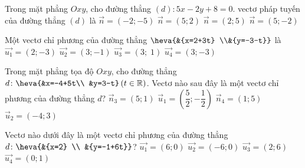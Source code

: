\begin{ex}%
	Trong mặt phẳng $Oxy$, cho đường thẳng $(d)\colon 5x-2y+8=0$. vectơ pháp tuyến của  đường thẳng $(d)$ là
	 \choice
		{$\overrightarrow{n}=(-2;-5)$} 
		 {$\overrightarrow{n}=(5; 2)$}
		{$\overrightarrow{n}=(2; 5)$} 
		{\True $\overrightarrow{n}=(5;-2)$} 
\end{ex}

\begin{ex}%
	 Một vectơ chỉ phương của đường thẳng $\heva{&{x=2+3t} \\&{y=-3-t}}$ là
	\choice 
		{$\overrightarrow{u_1}=\left(2;-3\right)$} 
		{\True $\overrightarrow{u_2}=\left(3;-1\right)$} 
		{$\overrightarrow{u_3}=\left(3;  \; 1\right)$}
		{$\overrightarrow{u_4}=\left(3;-3\right)$} 
\end{ex}

\begin{ex}%
	Trong mặt phẳng  tọa độ $Oxy $, cho đường thẳng $d\colon \heva{&x=-4+5t\\ &y=3-t}\left( t\in\mathbb{R}\right) $. Vectơ nào sau đây là một vectơ chỉ phương của đường thẳng $d$?
	 \choice
		 {$\overrightarrow{n}_{3}=\left(5;1\right)$}
		 {\True $\overrightarrow{u}_{1}=\left(\dfrac{5}{2};-\dfrac{1}{2}\right)$}
		{$\overrightarrow{n}_{4}=\left(1;5\right)$} 
		{$\overrightarrow{u}_{2}=\left(-4;3\right)$} 
\end{ex}

\begin{ex}%
	Vectơ nào dưới đây là một vectơ chỉ phương của đường thẳng $d\colon \heva{&{x=2}  \\ &{y=-1+6t}}$?
	 \choice
		 {$\overrightarrow{u_1}=\left(6;0\right)$}
		 {$\overrightarrow{u_2}=\left(-6;0\right)$}
		{$\overrightarrow{u_3}=\left(2;6\right)$} 
		{\True $\overrightarrow{u_4}=\left(0;1\right)$} 
\end{ex}

